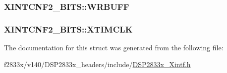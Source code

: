 \subsubsection[{W\+R\+B\+U\+F\+F}]{ X\+I\+N\+T\+C\+N\+F2\+\_\+\+B\+I\+T\+S\+::\+W\+R\+B\+U\+F\+F}\label{struct_x_i_n_t_c_n_f2___b_i_t_s_a6e3c860916adc222c1dce775d180ff92}
\hypertarget{struct_x_i_n_t_c_n_f2___b_i_t_s_a73ee1ee03fb6f0c270f1b2cc80454696}{}
\subsubsection[{X\+T\+I\+M\+C\+L\+K}]{ X\+I\+N\+T\+C\+N\+F2\+\_\+\+B\+I\+T\+S\+::\+X\+T\+I\+M\+C\+L\+K}\label{struct_x_i_n_t_c_n_f2___b_i_t_s_a73ee1ee03fb6f0c270f1b2cc80454696}


The documentation for this struct was generated from the following file\+:\begin{DoxyCompactItemize}
\item 
f2833x/v140/\+D\+S\+P2833x\+\_\+headers/include/\hyperlink{_d_s_p2833x___xintf_8h}{D\+S\+P2833x\+\_\+\+Xintf.\+h}\end{DoxyCompactItemize}
